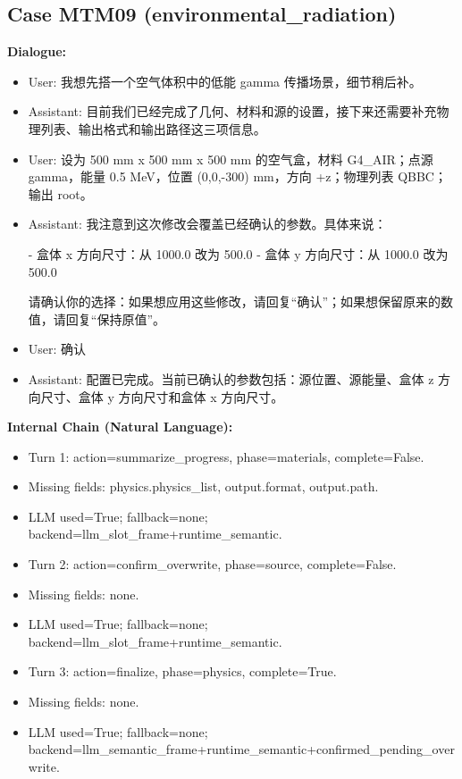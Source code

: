 \documentclass[11pt]{ctexart}
\begin{document}
\subsection{Case MTM09 (environmental\_radiation)}
\textbf{Dialogue:}
\begin{itemize}
\item User: 我想先搭一个空气体积中的低能 gamma 传播场景，细节稍后补。
\item Assistant: 目前我们已经完成了几何、材料和源的设置，接下来还需要补充物理列表、输出格式和输出路径这三项信息。
\item User: 设为 500 mm x 500 mm x 500 mm 的空气盒，材料 G4\_AIR；点源 gamma，能量 0.5 MeV，位置 (0,0,-300) mm，方向 +z；物理列表 QBBC；输出 root。
\item Assistant: 我注意到这次修改会覆盖已经确认的参数。具体来说：

- 盒体 x 方向尺寸：从 1000.0 改为 500.0
- 盒体 y 方向尺寸：从 1000.0 改为 500.0

请确认你的选择：如果想应用这些修改，请回复“确认”；如果想保留原来的数值，请回复“保持原值”。
\item User: 确认
\item Assistant: 配置已完成。当前已确认的参数包括：源位置、源能量、盒体 z 方向尺寸、盒体 y 方向尺寸和盒体 x 方向尺寸。
\end{itemize}
\textbf{Internal Chain (Natural Language):}
\begin{itemize}
\item Turn 1: action=summarize\_progress, phase=materials, complete=False.
\item Missing fields: physics.physics\_list, output.format, output.path.
\item LLM used=True; fallback=none; backend=llm\_slot\_frame+runtime\_semantic.
\item Turn 2: action=confirm\_overwrite, phase=source, complete=False.
\item Missing fields: none.
\item LLM used=True; fallback=none; backend=llm\_slot\_frame+runtime\_semantic.
\item Turn 3: action=finalize, phase=physics, complete=True.
\item Missing fields: none.
\item LLM used=True; fallback=none; backend=llm\_semantic\_frame+runtime\_semantic+confirmed\_pending\_overwrite.
\end{itemize}
\end{document}
